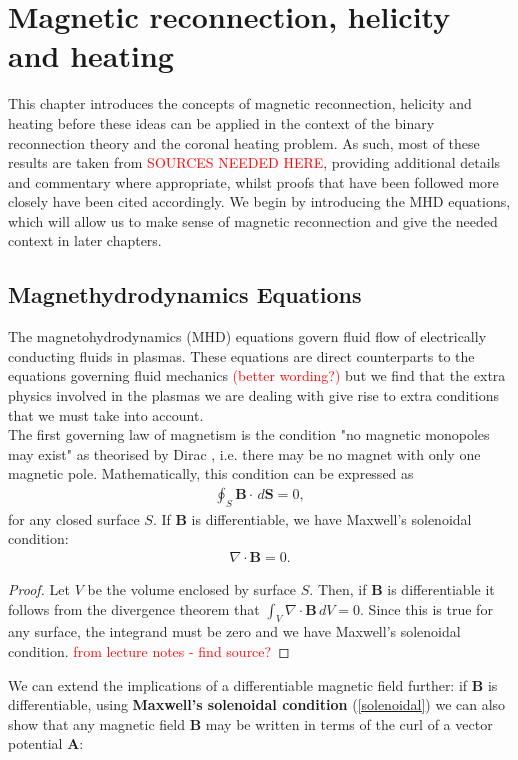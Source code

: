\setcounter{equation}{0}
\chapter{Magnetic reconnection, helicity and heating}

This chapter introduces the concepts of magnetic reconnection, helicity and heating before these ideas can be applied in the context of the binary reconnection theory and the coronal heating problem. As such, most of these results are taken from \textcolor{red}{SOURCES NEEDED HERE}, providing additional details and commentary where appropriate, whilst proofs that have been followed more closely have been cited accordingly.
We begin by introducing the MHD equations, which will allow us to make sense of magnetic reconnection and give the needed context in later chapters.
\section{Magnethydrodynamics Equations}
The magnetohydrodynamics (MHD) equations govern fluid flow of electrically conducting fluids in plasmas. These equations are direct counterparts to the equations governing fluid mechanics \textcolor{red}{(better wording?)} but we find that the extra physics involved in the plasmas we are dealing with give rise to extra conditions that we must take into account. \\
The first governing law of magnetism is the condition "no magnetic monopoles may exist" as theorised by Dirac \cite{dirac}, i.e. there may be no magnet with only one magnetic pole. Mathematically, this condition can be expressed as
\begin{align}
    \oint_{S} \mathbf{B}\cdot\, d \mathbf{S} = 0,
\end{align}
for any closed surface $S$. If $\mathbf{B}$ is differentiable, we have Maxwell's solenoidal condition:
\begin{align}
    \nabla \cdot \mathbf{B} = 0. \label{solenoidal}
\end{align}
\begin{proof}
Let $V$ be the volume enclosed by surface $S$. Then, if $\mathbf{B}$ is differentiable it follows from the divergence theorem that $\int_V \nabla\cdot\mathbf{B}\,dV =0$. Since this is true for any surface, the integrand must be zero and we have Maxwell's solenoidal condition. \textcolor{red}{from lecture notes - find source?}
\end{proof}
We can extend the implications of a differentiable magnetic field further: if $\mathbf{B}$ is differentiable, using \textbf{Maxwell's solenoidal condition} (\ref{solenoidal}) we can also show that any magnetic field $\mathbf{B}$ may be written in terms of the curl of a vector potential $\mathbf{A}$:
